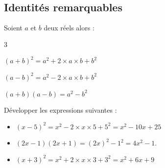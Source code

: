 \newpage

\subsection{Identités remarquables}

\begin{Théorème}
Soient $a$ et $b$ deux réels alors : 
\vspace{-0.5cm}
\begin{multicols}{3}
\begin{itemize}[label=\textcolor{Couleur1}{$\bullet$}]
\begin{large}
\item $(a+b)^2=a^2+2\times a \times b+b^2$
\item $(a-b)^2=a^2-2\times a \times b+b^2$
\item $(a+b)(a-b)=a^2 - b^2$
\end{large}
\end{itemize}
\end{multicols}
\vspace{0.2cm}
\end{Théorème}

\begin{Exemple}
Développer les expressions suivantes :

\begin{itemize}[label=\textcolor{Couleur8}{$\bullet$}]
\item $(x-5)^2 =x^2 -2\times x\times 5+5^2 = x^2-10x +25$
\item  $(2x-1)(2x+1)=(2x)^2 -1^2 =4x^2 -1$.
\item $(x+3)^2=x^2+2\times x \times 3 +3^2 =x^2 +6x+9$
\end{itemize}


\end{Exemple}

